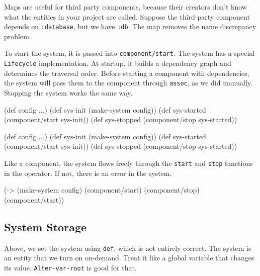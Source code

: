 \fi

Maps are useful for third party components, because their creators don't know what the entities in your project are called. Suppose the third-party component depends on \verb|:database|, but we have \verb|:db|. The map removes the name discrepancy problem.

To start the system, it is passed into \verb|component/start|. The system has a special \verb|Lifecycle| implementation. At startup, it builds a dependency graph and determines the traversal order. Before starting a component with dependencies, the system will pass them to the component through \verb|assoc|, as we did manually. Stopping the system works the same way.

\ifnarrow

\begin{english}
  \begin{clojure}
(def config {...})
(def sys-init (make-system config))
(def sys-started
  (component/start sys-init))
(def sys-stopped
  (component/stop sys-started))
  \end{clojure}
\end{english}

\else

\begin{english}
  \begin{clojure}
(def config {...})
(def sys-init (make-system config))
(def sys-started (component/start sys-init))
(def sys-stopped (component/stop sys-started))
  \end{clojure}
\end{english}

\fi

Like a component, the system flows freely through the \verb|start| and \verb|stop| functions in the \arr operator. If not, there is an error in the system.

\begin{english}
  \begin{clojure}
(-> (make-system config)
    (component/start)
    (component/stop)
    (component/start))
  \end{clojure}
\end{english}

\subsection{System Storage}


Above, we set the system using \verb|def|, which is not entirely correct. The system is an entity that we turn on on-demand. Treat it like a global variable that changes its value. \verb|Alter-var-root| is good for that.

